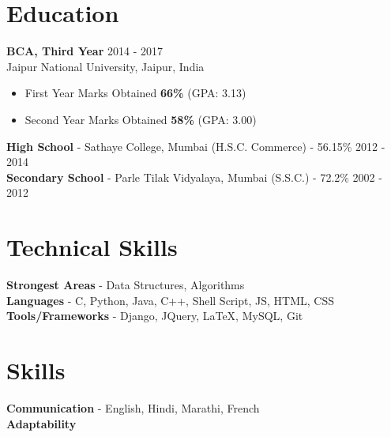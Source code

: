 \documentclass[line, margin]{res}
\begin{document}
\address{S.V.Road \\ Andheri, Mumbai 400058 \\ +91-9920945449}
 
\begin{resume}
\section{Education}
\textbf{BCA, Third Year} \hfill 2014 - 2017 \\
{Jaipur National University, Jaipur, India}
\begin{itemize}
 \item First Year Marks Obtained \textbf{66\%} (GPA: 3.13)
 \item Second Year Marks Obtained \textbf{58\%} (GPA: 3.00)
\end{itemize}
\textbf{High School} - {Sathaye College, Mumbai} (H.S.C. Commerce) - 56.15\% \hfill 2012 - 2014 \\
\textbf{Secondary School} - Parle Tilak Vidyalaya, Mumbai (S.S.C.) - 72.2\% \hfill 2002 - 2012
 
\section{Technical Skills}
\textbf{Strongest Areas} - Data Structures, Algorithms \\
\textbf{Languages} - C, Python, Java, C++, Shell Script, JS, HTML, CSS\\
\textbf{Tools/Frameworks} - Django, JQuery, \LaTeX, MySQL, Git

\section{Skills}
\textbf{Communication} - English, Hindi, Marathi, French \\
\textbf{Adaptability}
 

\end{resume}
\end{document}
